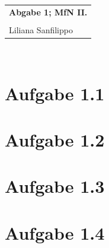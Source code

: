 \documentclass{article} %
\newcommand{\titulo}{Abgabe 1; MfN II.}
\newcommand{\nombre}{Liliana Sanfilippo}
\begin{document}
\begin{tabular}{p{12cm}}
{{\Large\bf\titulo}}\\
\vspace{0.2cm}\\
 {\large\nombre}\\
\end{tabular}
\vspace{0.2cm}\\
\section{Aufgabe 1.1}

\section{Aufgabe 1.2}

\section{Aufgabe 1.3}

\section{Aufgabe 1.4}
\end{document}

